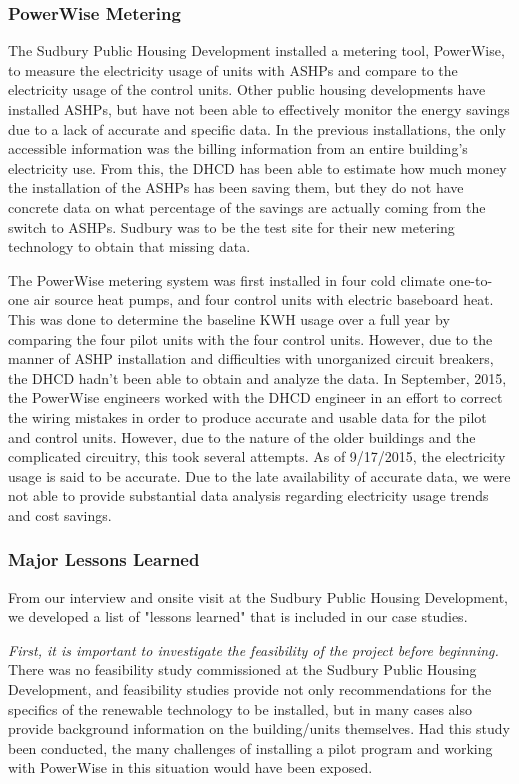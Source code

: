 \subsubsection{PowerWise Metering}
\par The Sudbury Public Housing Development installed a metering tool, PowerWise, to measure the electricity usage of units with ASHPs and compare to the electricity usage of the control units. Other public housing developments have installed ASHPs, but have not been able to effectively monitor the energy savings due to a lack of accurate and specific data. In the previous installations, the only accessible information was the billing information from an entire building’s electricity use. From this, the DHCD has been able to estimate how much money the installation of the ASHPs has been saving them, but they do not have concrete data on what percentage of the savings are actually coming from the switch to ASHPs. Sudbury was to be the test site for their new metering technology to obtain that missing data.
\par The PowerWise metering system was first installed in four cold climate one-to-one air source heat pumps, and four control units with electric baseboard heat. This was done to determine the baseline KWH usage over a full year by comparing the four pilot units with the four control units. However, due to the manner of ASHP installation and difficulties with unorganized circuit breakers, the DHCD hadn’t been able to obtain and analyze the data.  In September, 2015, the PowerWise engineers worked with the DHCD engineer in an effort to correct the wiring mistakes in order to produce accurate and usable data for the pilot and control units. However, due to the nature of the older buildings and the complicated circuitry, this took several attempts. As of 9/17/2015, the electricity usage is said to be accurate. Due to the late availability of accurate data, we were not able to provide substantial data analysis regarding electricity usage trends and cost savings.

\subsubsection{Major Lessons Learned}
\par From our interview and onsite visit at the Sudbury Public Housing Development, we developed a list of "lessons learned" that is included in our case studies.
\par \emph{First, it is important to investigate the feasibility of the project before beginning.} There was no feasibility study commissioned at the Sudbury Public Housing Development, and feasibility studies provide not only recommendations for the specifics of the renewable technology to be installed, but in many cases also provide background information on the building/units themselves. Had this study been conducted, the many challenges of installing a pilot program and working with PowerWise in this situation would have been exposed.

